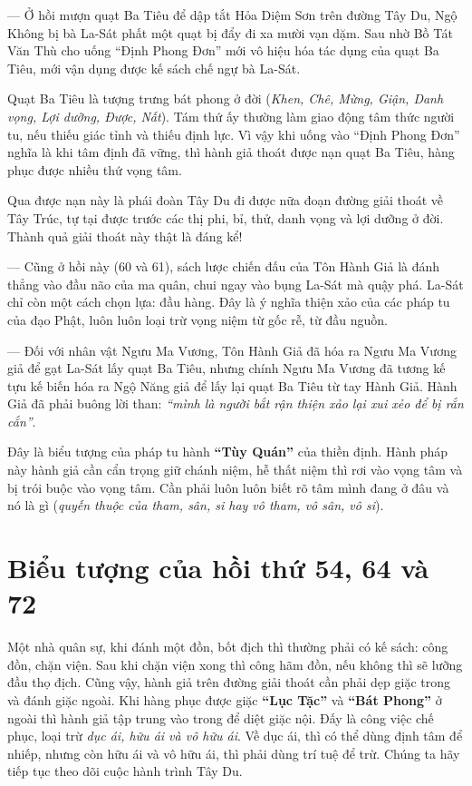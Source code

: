 — Ở hồi mượn quạt Ba Tiêu để dập tắt Hỏa Diệm Sơn trên đường Tây Du, Ngộ Không bị bà La-Sát phất một quạt bị đẩy đi xa mười vạn dặm. Sau nhờ Bồ Tát Văn Thù cho uống ``Định Phong Đơn'' mới vô hiệu hóa tác dụng của quạt Ba Tiêu, mới vận dụng được kế sách chế ngự bà La-Sát.

Quạt Ba Tiêu là tượng trưng bát phong ở đời (\emph{Khen, Chê, Mừng, Giận, Danh vọng, Lợi dưỡng, Được, Nất}). Tám thứ ấy thường làm giao động tâm thức người tu, nếu thiếu giác tỉnh và thiếu định lực. Vì vậy khi uống vào ``Định Phong Đơn'' nghĩa là khi tâm định đã vững, thì hành giả thoát được nạn quạt Ba Tiêu, hàng phục được nhiều thứ vọng tâm.

Qua được nạn này là phái đoàn Tây Du đi được nữa đoạn đường giải thoát về Tây Trúc, tự tại được trước các thị phi, bỉ, thử, danh vọng và lợi dưỡng ở đời. Thành quả giải thoát này thật là đáng kể!

— Cũng ở hồi này (60 và 61), sách lược chiến đấu của Tôn Hành Giả là đánh thẳng vào đầu não của ma quân, chui ngay vào bụng La-Sát mà quậy phá. La-Sát chỉ còn một cách chọn lựa: đầu hàng. Đây là ý nghĩa thiện xảo của các pháp tu của đạo Phật, luôn luôn loại trừ vọng niệm từ gốc rễ, từ đầu nguồn.

— Đối với nhân vật Ngưu Ma Vương, Tôn Hành Giả đã hóa ra Ngưu Ma Vương giả để gạt La-Sát lấy quạt Ba Tiêu, nhưng chính Ngưu Ma Vương đã tương kế tựu kế biến hóa ra Ngộ Năng giả để lấy lại quạt Ba Tiêu từ tay Hành Giả. Hành Giả đã phải buông lời than: \emph{``mình là người bắt rận thiện xảo lại xui xẻo để bị rắn cắn''}.

Đây là biểu tượng của pháp tu hành {\bf ``Tùy Quán''} của thiền định. Hành pháp này hành giả cần cẩn trọng giữ chánh niệm, hễ thất niệm thì rơi vào vọng tâm và bị trói buộc vào vọng tâm. Cần phải luôn luôn biết rõ tâm mình đang ở đâu và nó là gì (\emph{quyến thuộc của tham, sân, si hay vô tham, vô sân, vô si}).

\section{Biểu tượng của hồi thứ 54, 64 và 72} %
\label{sec:bieu_tuong_hoi_54_64_va_72}

Một nhà quân sự, khi đánh một đồn, bốt địch thì thường phải có kế sách: công đồn, chặn viện. Sau khi chặn viện xong thì công hãm đồn, nếu không thì sẽ lưỡng đầu thọ địch. Cũng vậy, hành giả trên đường giải thoát cần phải dẹp giặc trong và đánh giặc ngoài. Khi hàng phục được giặc {\bf ``Lục Tặc''} và {\bf ``Bát Phong''} ở ngoài thì hành giả tập trung vào trong để diệt giặc nội. Đấy là công việc chế phục, loại trừ \emph{dục ái, hữu ái và vô hữu ái}. Về dục ái, thì có thể dùng định tâm để nhiếp, nhưng còn hữu ái và vô hữu ái, thì phải dùng trí tuệ để trừ. Chúng ta hãy tiếp tục theo dõi cuộc hành trình Tây Du.

